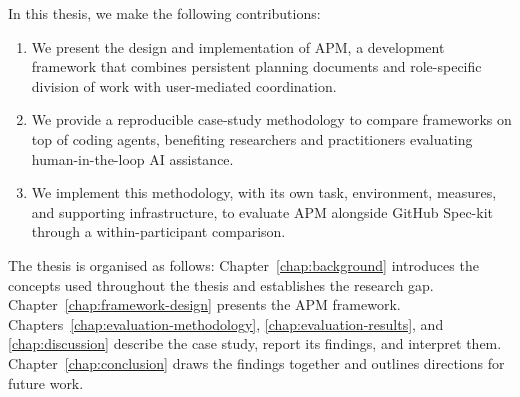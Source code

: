 In this thesis, we make the following contributions:

\begin{enumerate}
    \item We present the design and implementation of APM, a development framework that combines persistent planning documents and role-specific division of work with user-mediated coordination.
    \item We provide a reproducible case-study methodology to compare frameworks on top of coding agents, benefiting researchers and practitioners evaluating human-in-the-loop AI assistance.
    \item We implement this methodology, with its own task, environment, measures, and supporting infrastructure, to evaluate APM alongside GitHub Spec-kit through a within-participant comparison.
\end{enumerate}

The thesis is organised as follows: Chapter~\ref{chap:background} introduces the concepts used throughout the thesis and establishes the research gap. Chapter~\ref{chap:framework-design} presents the APM framework. Chapters~\ref{chap:evaluation-methodology}, \ref{chap:evaluation-results}, and \ref{chap:discussion} describe the case study, report its findings, and interpret them. Chapter~\ref{chap:conclusion} draws the findings together and outlines directions for future work.

